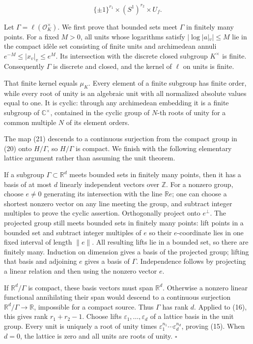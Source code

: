 \documentclass[
  english,
  11pt,
  a4paper,
]{article}
\begin{document}
\[\{\pm1\}^{r_1}\times(S^1)^{r_2}\times U_f.
\tag{22}\]

Let \(\Gamma=\ell(\mathcal O_K^\times)\). We first prove that bounded
sets meet \(\Gamma\) in finitely many points. For a fixed \(M>0\), all
units whose logarithms satisfy \(|\log|a|_v|\leq M\) lie in the compact
idèle set consisting of finite units and archimedean annuli
\(e^{-M}\leq|x_v|_v\leq e^M\). Its intersection with the discrete closed
subgroup \(K^\times\) is finite. Consequently \(\Gamma\) is discrete and
closed, and the kernel of \(\ell\) on units is finite.

That finite kernel equals \(\mu_K\). Every element of a finite subgroup
has finite order, while every root of unity is an algebraic unit with
all normalized absolute values equal to one. It is cyclic: through any
archimedean embedding it is a finite subgroup of \(\mathbb C^\times\),
contained in the cyclic group of \(N\)-th roots of unity for a common
multiple \(N\) of its element orders.

The map (21) descends to a continuous surjection from the compact group
in (20) onto \(H/\Gamma\), so \(H/\Gamma\) is compact. We finish with
the following elementary lattice argument rather than assuming the unit
theorem.

If a subgroup \(\Gamma\subset\mathbb R^d\) meets bounded sets in
finitely many points, then it has a basis of at most \(d\) linearly
independent vectors over \(\mathbb Z\). For a nonzero group, choose
\(e\ne0\) generating its intersection with the line \(\mathbb Re\); one
can choose a shortest nonzero vector on any line meeting the group, and
subtract integer multiples to prove the cyclic assertion. Orthogonally
project onto \(e^\perp\). The projected group still meets bounded sets
in finitely many points: lift points in a bounded set and subtract
integer multiples of \(e\) so their \(e\)-coordinate lies in one fixed
interval of length \(\|e\|\). All resulting lifts lie in a bounded set,
so there are finitely many. Induction on dimension gives a basis of the
projected group; lifting that basis and adjoining \(e\) gives a basis of
\(\Gamma\). Independence follows by projecting a linear relation and
then using the nonzero vector \(e\).

If \(\mathbb R^d/\Gamma\) is compact, these basis vectors must span
\(\mathbb R^d\). Otherwise a nonzero linear functional annihilating
their span would descend to a continuous surjection
\(\mathbb R^d/\Gamma\to\mathbb R\), impossible for a compact source.
Thus \(\Gamma\) has rank \(d\). Applied to (16), this gives rank
\(r_1+r_2-1\). Choose lifts \(\varepsilon_1,\ldots,\varepsilon_d\) of a
lattice basis in the unit group. Every unit is uniquely a root of unity
times \(\varepsilon_1^{n_1}\cdots\varepsilon_d^{n_d}\), proving (15).
When \(d=0\), the lattice is zero and all units are roots of unity.
\(\square\)
\end{document}
